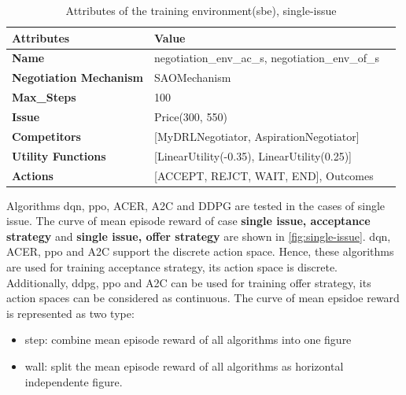 \begin{table}[htbp]
\centering
\begin{tabular}{l l l} \toprule
\bfseries \textbf{Attributes}      & \bfseries \textbf{Value}             \\ \midrule
\textbf{Name}                    & negotiation\_env\_ac\_s, negotiation\_env\_of\_s \\
\textbf{Negotiation Mechanism}   & SAOMechanism                                        \\
\textbf{Max\_Steps}              & 100                                                 \\
\textbf{Issue}             	     & Price(300, 550)                                     \\
\textbf{Competitors}             & [MyDRLNegotiator, AspirationNegotiator]             \\
\textbf{Utility Functions}       & [LinearUtility(-0.35), LinearUtility(0.25)]         \\
\textbf{Actions}                 & [ACCEPT, REJCT, WAIT, END], Outcomes\\
\bottomrule
\end{tabular}
\caption{Attributes of the training environment(sbe), single-issue}
\label{tab:attributes-sbe}
\end{table}

Algorithms \gls{dqn}, \gls{ppo}, ACER\parencite{DBLP:journals/corr/WangBHMMKF16}, A2C and DDPG are tested in the cases of single issue. The curve of mean episode reward of case  \textbf{single issue, acceptance strategy} and \textbf{single issue, offer strategy} are shown in \ref{fig:single-issue}. \gls{dqn}, ACER, \gls{ppo} and A2C support the discrete action space. Hence, these algorithms are used for training acceptance strategy, its action space is discrete. Additionally, \gls{ddpg}, \gls{ppo} and A2C can be used for training offer strategy, its action spaces can be considered as continuous. The curve of mean epsidoe reward is represented as two type: 
\begin{itemize}
\item step: combine mean episode reward of all algorithms into one figure
\item wall: split the mean episode reward of all algorithms as horizontal independente figure.
\end{itemize}

